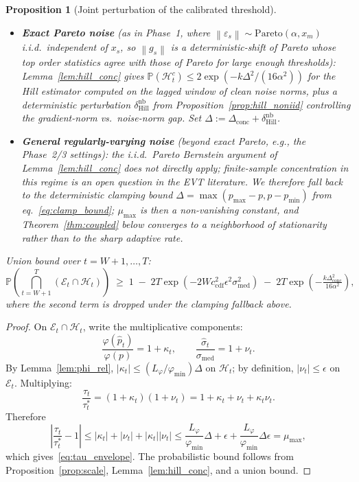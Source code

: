 \documentclass[11pt]{article}
\newtheorem{proposition}[theorem]{Proposition}
\theoremstyle{definition}
\newcommand{\Prob}{\mathbb{P}}
\newcommand{\norm}[1]{\left\| #1 \right\|}
\newcommand{\abs}[1]{\left| #1 \right|}
\newcommand{\phat}{\hat{p}}
\newcommand{\shat}{\hat{\sigma}}
\begin{document}
\begin{proposition}[Joint perturbation of the calibrated threshold]
\begin{itemize}[noitemsep,leftmargin=*]
  \item \textbf{Exact Pareto noise} \textup{(}as in Phase~1, where
    $\norm{\varepsilon_s}\sim\mathrm{Pareto}(\alpha, x_m)$ i.i.d.\
    independent of $x_s$, so $\norm{g_s}$ is a deterministic-shift of
    Pareto whose top order statistics agree with those of Pareto for large
    enough thresholds\textup{)}: Lemma~\ref{lem:hill_conc} gives
    $\Prob(\mathcal H_t^c) \leq 2\exp(-k\Delta^2/(16\alpha^2))$ for the
    Hill estimator computed on the lagged window of clean noise norms,
    plus a deterministic perturbation
    $\delta^{\mathrm{nb}}_{\mathrm{Hill}}$ from
    Proposition~\ref{prop:hill_noniid} controlling the gradient-norm vs.\
    noise-norm gap. Set
    $\Delta := \Delta_{\mathrm{conc}} + \delta^{\mathrm{nb}}_{\mathrm{Hill}}$.
  \item \textbf{General regularly-varying noise} \textup{(}beyond exact
    Pareto, e.g., the Phase~2/3 settings\textup{)}: the i.i.d.\ Pareto
    Bernstein argument of Lemma~\ref{lem:hill_conc} \emph{does not directly
    apply}; finite-sample concentration in this regime is an open question
    in the EVT literature. We therefore fall back to the deterministic
    clamping bound $\Delta = \max(p_{\max}-p, p-p_{\min})$ from
    eq.~\eqref{eq:clamp_bound}; $\mu_{\max}$ is then a non-vanishing
    constant, and Theorem~\ref{thm:coupled} below converges to a
    neighborhood of stationarity rather than to the sharp adaptive rate.
\end{itemize}

Union bound over $t = W+1, \ldots, T$:
\begin{equation}\label{eq:union_prob}
  \Prob\!\left(\bigcap_{t=W+1}^T (\mathcal{E}_t \cap \mathcal{H}_t)\right)
  \;\geq\; 1 \;-\; 2T\exp\!\left(-2W c_{\mathrm{cdf}}^2\epsilon^2\sigma_{\mathrm{med}}^2\right)
  \;-\; 2T\exp\!\left(-\tfrac{k\Delta_{\mathrm{conc}}^2}{16\alpha^2}\right),
\end{equation}
where the second term is dropped under the clamping fallback above.
\end{proposition}

\begin{proof}
On $\mathcal{E}_t \cap \mathcal{H}_t$, write the multiplicative components:
\[
  \frac{\varphi(\phat_t)}{\varphi(p)} = 1 + \kappa_t,
  \qquad
  \frac{\shat_t}{\sigma_{\mathrm{med}}} = 1 + \nu_t.
\]
By Lemma~\ref{lem:phi_rel},
$\abs{\kappa_t} \leq (L_\varphi/\varphi_{\min})\Delta$ on $\mathcal{H}_t$;
by definition, $\abs{\nu_t} \leq \epsilon$ on $\mathcal{E}_t$.
Multiplying:
\[
  \frac{\tau_t}{\tau_t^{*}}
  = (1+\kappa_t)(1+\nu_t)
  = 1 + \kappa_t + \nu_t + \kappa_t\nu_t.
\]
Therefore
\[
  \abs{\frac{\tau_t}{\tau_t^{*}} - 1}
  \leq \abs{\kappa_t} + \abs{\nu_t} + \abs{\kappa_t}\abs{\nu_t}
  \leq \frac{L_\varphi}{\varphi_{\min}}\Delta + \epsilon
    + \frac{L_\varphi}{\varphi_{\min}}\Delta\epsilon
  = \mu_{\max},
\]
which gives~\eqref{eq:tau_envelope}. The probabilistic bound
follows from Proposition~\ref{prop:scale}, Lemma~\ref{lem:hill_conc}, and a
union bound.
\end{proof}
\end{document}
